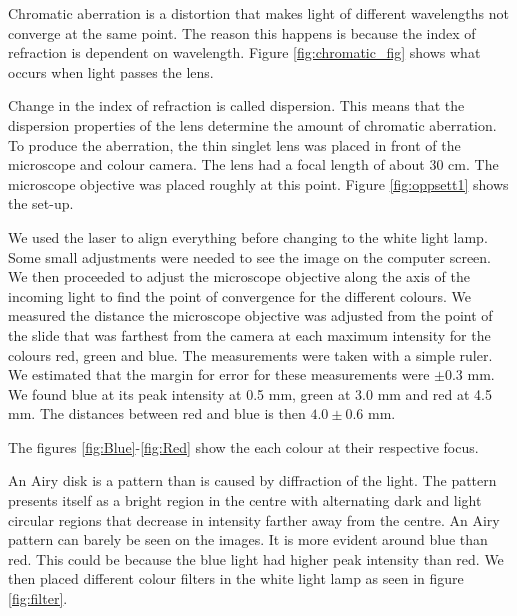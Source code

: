 Chromatic aberration is a distortion that makes light of different wavelengths not converge at the same point. The reason this happens is because the index of refraction is dependent on wavelength. Figure \vref{fig:chromatic_fig} shows what occurs when light passes the lens.


 Change in the index of refraction is called dispersion. This means that the dispersion properties of the lens determine the amount of chromatic aberration. To produce the aberration, the thin singlet lens was placed in front of the microscope and colour camera. The lens had a focal length of about 30 cm. The microscope objective was placed roughly at this point. Figure \vref{fig:oppsett1} shows the set-up. 


We used the laser to align everything before changing to the white light lamp. Some small adjustments were needed to see the image on the computer screen. We then proceeded to adjust the microscope objective along the axis of the incoming light to find the point of convergence for the different colours. We measured the distance the microscope objective was adjusted from the point of the slide that was farthest from the camera at each maximum intensity for the colours red, green and blue. The measurements were taken with a simple ruler. We estimated that the margin for error for these measurements were $\pm 0.3$ mm. We found blue at its peak intensity at 0.5 mm, green at 3.0 mm and red at 4.5 mm. The distances between red and blue is then $4.0 \pm 0.6$ mm.


The figures \vref{fig:Blue}-\vref{fig:Red} show the each colour at their respective focus.

An Airy disk is a pattern than is caused by diffraction of the light. The pattern presents itself as a bright region in the centre with alternating dark and light circular regions that decrease in intensity farther away from the centre. An Airy pattern can barely be seen on the images. It is more evident around blue than red. This could be because the blue light had higher peak intensity than red. We then placed different colour filters in the white light lamp as seen in figure \vref{fig:filter}.

